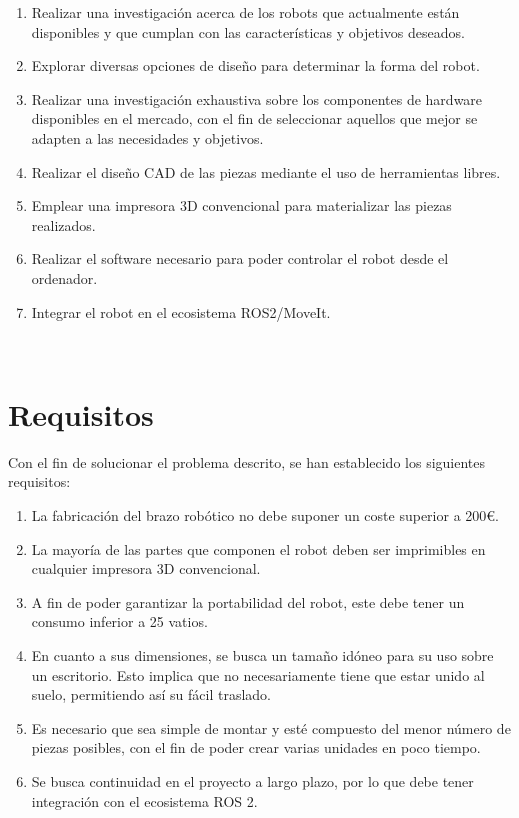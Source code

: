 \begin{enumerate}
    \item Realizar una investigación acerca de los robots que actualmente están disponibles y que cumplan con 
          las características y objetivos deseados. 
    \item Explorar diversas opciones de diseño para determinar la forma del robot. 
      
    \item Realizar una investigación exhaustiva sobre los componentes de hardware disponibles en el mercado, con el fin de seleccionar 
          aquellos que mejor se adapten a las necesidades y objetivos.
    
    \item Realizar el diseño \acs{CAD} de las piezas mediante el uso de herramientas libres. 

    \item Emplear una impresora 3D convencional para materializar las piezas realizados.

    \item Realizar el software necesario para poder controlar el robot desde el ordenador.

    \item Integrar el robot en el ecosistema \ac{ROS}2/MoveIt. 
 
\end{enumerate}\

\section{Requisitos}
\label{sec:requisitos}
Con el fin de solucionar el problema descrito, se han establecido los siguientes requisitos:
\begin{enumerate}
      \item La fabricación del brazo robótico no debe suponer un coste superior a 200\euro.
      \item La mayoría de las partes que componen el robot deben ser imprimibles en cualquier impresora 3D convencional.
      \item A fin de poder garantizar la portabilidad del robot, este debe tener un consumo inferior a 25 vatios.
      \item En cuanto a sus dimensiones, se busca un tamaño idóneo para su uso sobre un escritorio. Esto implica que no necesariamente 
      tiene que estar unido al suelo, permitiendo así su fácil traslado.
      \item Es necesario que sea simple de montar y esté compuesto del menor número de piezas posibles, con el fin de poder crear varias unidades 
      en poco tiempo. 
      \item Se busca continuidad en el proyecto a largo plazo, por lo que debe tener integración con el ecosistema \acs{ROS} 2. 

\end{enumerate}\

